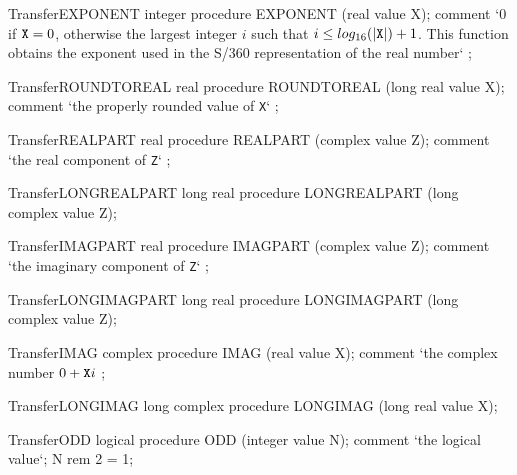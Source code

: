 \documentclass[a4paper]{article}
\begin{document}
\begin{ProcedureDeclaration}{Transfer}{EXPONENT}
integer procedure EXPONENT (real value X);
comment `\rm $0$ if ${\tt X} = 0$, otherwise the largest integer $i$ such that $i \le log_{16}(|{\tt X}|) + 1$. This function obtains the exponent used in the S/360 representation of the real number` ;
\end{ProcedureDeclaration}

\begin{ProcedureDeclaration}{Transfer}{ROUNDTOREAL}
real procedure ROUNDTOREAL  (long real value X);
comment `\rm the properly rounded value of {\tt X}` ;
\end{ProcedureDeclaration}

\begin{ProcedureDeclaration}{Transfer}{REALPART}
real procedure REALPART (complex value Z);
comment `\rm the real component of {\tt Z}` ;
\end{ProcedureDeclaration}

\begin{ProcedureDeclaration}{Transfer}{LONGREALPART}
long real procedure LONGREALPART (long complex value Z);
\end{ProcedureDeclaration}

\begin{ProcedureDeclaration}{Transfer}{IMAGPART}
real procedure IMAGPART (complex value Z);
comment `\rm the imaginary component of {\tt Z}` ;
\end{ProcedureDeclaration}

\begin{ProcedureDeclaration}{Transfer}{LONGIMAGPART}
long real procedure LONGIMAGPART (long complex value Z);
\end{ProcedureDeclaration}

\begin{ProcedureDeclaration}{Transfer}{IMAG}
complex procedure IMAG (real value X);
comment `\rm the complex number $0 + {\tt X} i$ ;
\end{ProcedureDeclaration}

\begin{ProcedureDeclaration}{Transfer}{LONGIMAG}
long complex procedure LONGIMAG (long real value X);
\end{ProcedureDeclaration}

\begin{ProcedureDeclaration}{Transfer}{ODD}
logical procedure ODD (integer value N);
comment `\rm the logical value`; N rem 2 = 1;
\end{ProcedureDeclaration}
\end{document}
